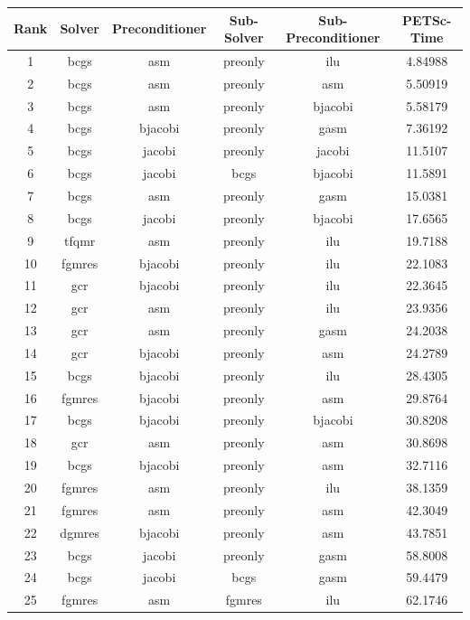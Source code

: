 \begin{table}[h]
  \tiny
  \centering
  \begin{tabular}{cccccc}
    \hline Rank & Solver & Preconditioner & Sub-Solver & Sub-Preconditioner & PETSc-Time\\ \hline

    1 & bcgs & asm & preonly & ilu & 4.84988 \\
    2 & bcgs & asm & preonly & asm & 5.50919 \\
    3 & bcgs & asm & preonly & bjacobi & 5.58179 \\
    4 & bcgs & bjacobi & preonly & gasm & 7.36192 \\
    5 & bcgs & jacobi & preonly & jacobi & 11.5107 \\
    6 & bcgs & jacobi & bcgs & bjacobi & 11.5891 \\
    7 & bcgs & asm & preonly & gasm & 15.0381 \\
    8 & bcgs & jacobi & preonly & bjacobi & 17.6565 \\
    9 & tfqmr & asm & preonly & ilu & 19.7188 \\
    10 & fgmres & bjacobi & preonly & ilu & 22.1083 \\
    11 & gcr & bjacobi & preonly & ilu & 22.3645 \\
    12 & gcr & asm & preonly & ilu & 23.9356 \\
    13 & gcr & asm & preonly & gasm & 24.2038 \\
    14 & gcr & bjacobi & preonly & asm & 24.2789 \\
    15 & bcgs & bjacobi & preonly & ilu & 28.4305 \\
    16 & fgmres & bjacobi & preonly & asm & 29.8764 \\
    17 & bcgs & bjacobi & preonly & bjacobi & 30.8208 \\
    18 & gcr & asm & preonly & asm & 30.8698 \\
    19 & bcgs & bjacobi & preonly & asm & 32.7116 \\
    20 & fgmres & asm & preonly & ilu & 38.1359 \\
    21 & fgmres & asm & preonly & asm & 42.3049 \\
    22 & dgmres & bjacobi & preonly & asm & 43.7851 \\
    23 & bcgs & jacobi & preonly & gasm & 58.8008 \\
    24 & bcgs & jacobi & bcgs & gasm & 59.4479 \\
    25 & fgmres & asm & fgmres & ilu & 62.1746 \\

\end{tabular}
\end{table}
